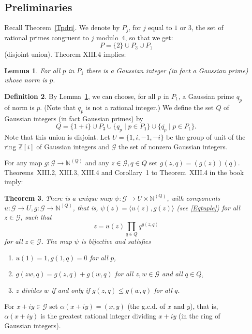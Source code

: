 \documentclass[12pt,letterpaper]{article}
\newcommand{\G}{\mathcal{G}}
\newcommand{\N}{\mathbb{N}}
\newcommand{\Z}{\mathbb{Z}}
\newtheorem{thm}{Theorem}%
\newtheorem{lem}[thm]{Lemma} %
\theoremstyle{definition}
\newtheorem{defn}[thm]{Definition}
\begin{document}
\subsection{Preliminaries} %

Recall Theorem~\ref{Tpdri}. We denote by $P_j$, for $j$ equal to $1$ or $3$, the set of rational primes congruent to $j$ modulo~$4$, so that we get: 
$$
P=\{2\}\cup P_3\cup P_1
$$ 
(disjoint union). Theorem XIII.4 implies: 

\begin{lem}\label{Lqp}
For all $p$ in $P_1$ there is a Gaussian integer (in fact a Gaussian prime) whose norm is $p$. 
\end{lem}

\begin{defn}
By Lemma~\ref{Lqp}, we can choose, for all $p$ in $P_1$, a Gaussian prime $q_p$ of norm is $p$. (Note that $q_p$ is not a rational integer.) We define the set $Q$ of Gaussian integers (in fact Gaussian primes) by 
$$
Q=\{1+i\}\cup P_3\cup\{q_p\mid p\in P_1\}\cup\{\overline{q_p}\mid p\in P_1\}.
$$ 
Note that this union is disjoint. Let $U=\{1,i,-1,-i\}$ be the group of unit of the ring $\Z[i]$ of Gaussian integers and $\G$ the set of nonzero Gaussian integers. 
\end{defn}

For any map $g:\G\to\N^{(Q)}$ and any $z\in\G, q\in Q$ set $g(z,q)=(g(z))(q)$. Theorems~XIII.2, XIII.3, XIII.4 and Corollary~1 to Theorem~XIII.4 in the book imply: 

\begin{thm}\label{Tpdgi}
There is a unique map $\psi:\G\to U\times\N^{(Q)}$, with components $u:\G\to U, g:\G\to\N^{(Q)}$, that is, $\psi(z)=\langle u(z),g(z)\rangle$ (see \eqref{Eqtuple}) for all $z\in\G$, such that 
\begin{equation}
z = u(z) \prod_{q\in Q} q^{g(z,q)}
\end{equation} 
for all $z\in\G$. The map $\psi$ is bijective and satisfies 
\begin{enumerate}
\item $u(1)=1, g(1,q)=0$ for all $p$, 
\item $g(zw,q)=g(z,q)+g(w,q)$ for all $z,w\in\G$ and all $q\in Q$, 
\item $z$ divides $w$ if and only if $g(z,q)\le g(w,q)$ for all $q$. 
\end{enumerate}
\end{thm}

For $x+iy\in\G$ set $\alpha(x+iy)=(x,y)$ (the g.c.d. of $x$ and $y$), that is, $\alpha(x+iy)$ is the greatest rational integer dividing $x+iy$ (in the ring of Gaussian integers). 
\end{document}
